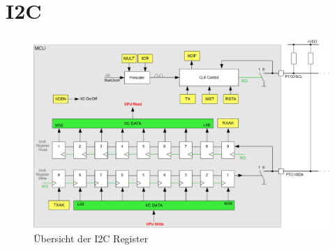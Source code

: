 \newpage
\section{I2C}

\begin{figure}[h!]
	\centering
	\includegraphics[width=1\textwidth]{../fig/i2c.pdf}
	\caption{Übersicht der I2C Register}
\end{figure}
